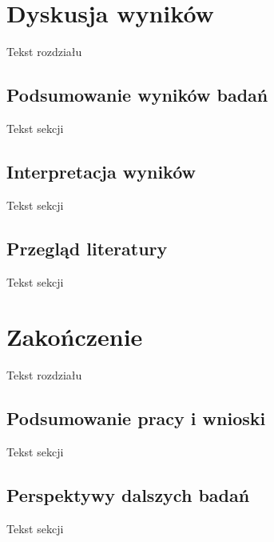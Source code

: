 \documentclass[licencjacka]{pracamgr}
\begin{document}
\chapter{Dyskusja wyników}
Tekst rozdziału
\section{Podsumowanie wyników badań}
Tekst sekcji
\section{Interpretacja wyników}
Tekst sekcji
\section{Przegląd literatury}
Tekst sekcji

\chapter{Zakończenie}
Tekst rozdziału
\section{Podsumowanie pracy i wnioski}
Tekst sekcji
\section{Perspektywy dalszych badań}
Tekst sekcji
\end{document}
